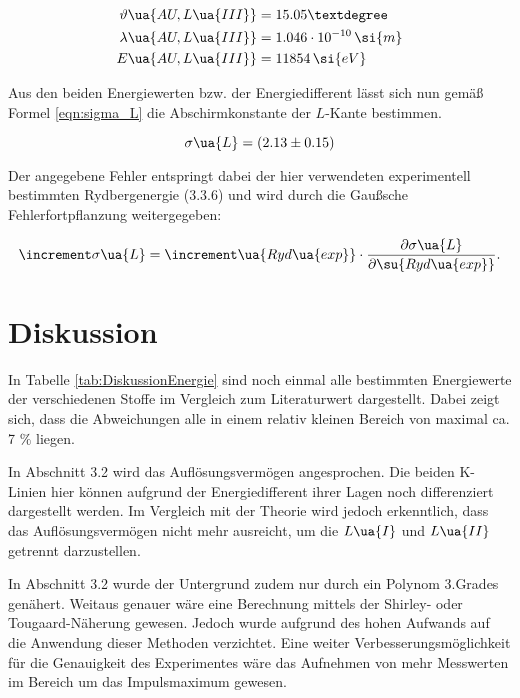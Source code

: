 \begin{align*}
  \vartheta\ua{AU,L\ua{III}} &= 15.05 ° \\
  \lambda\ua{AU,L\ua{III}} &= 1.046 \cdot 10^{-10} \, \si{m} \\
  E\ua{AU,L\ua{III}} &= 11854 \, \si{eV}
\end{align*}

Aus den beiden Energiewerten bzw. der Energiedifferent lässt sich nun
gemäß Formel \eqref{eqn:sigma_L} die Abschirmkonstante der $L$-Kante bestimmen.

\begin{equation}
  \sigma\ua{L} = (2.13 \pm 0.15)
\end{equation}

Der angegebene Fehler entspringt dabei der hier verwendeten experimentell bestimmten
Rydbergenergie (3.3.6) und wird durch die Gaußsche Fehlerfortpflanzung weitergegeben:

\begin{equation}
  \increment \sigma\ua{L} = \increment\ua{Ryd\ua{exp}} \cdot \frac{\partial \sigma\ua{L}}{\partial \su{Ryd\ua{exp}}} .
\end{equation}

\newpage %

\section{Diskussion}

In Tabelle \ref{tab:DiskussionEnergie} sind noch einmal alle bestimmten Energiewerte
der verschiedenen Stoffe im Vergleich zum Literaturwert dargestellt. Dabei zeigt sich,
dass die Abweichungen alle in einem relativ kleinen Bereich von maximal ca. 7 $\%$
liegen.



In Abschnitt 3.2 wird das Auflösungsvermögen angesprochen. Die beiden K-Linien
hier können aufgrund der Energiedifferent ihrer Lagen noch differenziert dargestellt
werden. Im Vergleich mit der Theorie wird jedoch erkenntlich, dass das Auflösungsvermögen
nicht mehr ausreicht, um die $L\ua{I}$ und $L\ua{II}$ getrennt darzustellen.

In Abschnitt 3.2 wurde der Untergrund zudem nur durch ein Polynom 3.Grades genähert.
Weitaus genauer wäre eine Berechnung mittels der Shirley- oder Tougaard-Näherung
gewesen. Jedoch wurde aufgrund des hohen Aufwands auf die Anwendung dieser Methoden
verzichtet. Eine weiter Verbesserungsmöglichkeit für die Genauigkeit des Experimentes
wäre das Aufnehmen von mehr Messwerten im Bereich um das Impulsmaximum gewesen.

